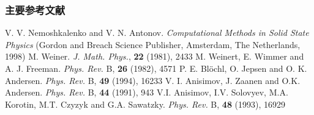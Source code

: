 \documentclass[cjk,slidestop,compress,mathserif,blue]{beamer}
\begin{document}
\begin{thebibliography}{99}
\frame
{
\frametitle{主要参考文献}
{\small
\textrm{V. V. Nemoshkalenko and V. N. Antonov. \textit{Computational Methods in Solid State Physics} (Gordon and Breach Science Publisher, Amsterdam, The Netherlands, 1998)}
\textrm{M. Weiner. \textit{J. Math. Phys.}, \textbf{22} (1981), 2433}
\textrm{M. Weinert, E. Wimmer and A. J. Freeman. \textit{Phys. Rev.} B, \textbf{26} (1982), 4571}
\textrm{P. E. Bl\"ochl, O. Jepsen and O. K. Andersen. \textit{Phys. Rev.} B, \textbf{49} (1994), 16233}
\textrm{V. I. Anisimov, J. Zaanen and O.K. Andersen. \textit{Phys. Rev.} B, \textbf{44} (1991), 943}
\textrm{V.I. Anisimov, I.V. Solovyev, M.A. Korotin, M.T. Czyzyk and G.A. Sawatzky. \textit{Phys. Rev.} B, \textbf{48} (1993), 16929}
\nocite{*}																				%
}
}
\end{thebibliography}

\end{document}
